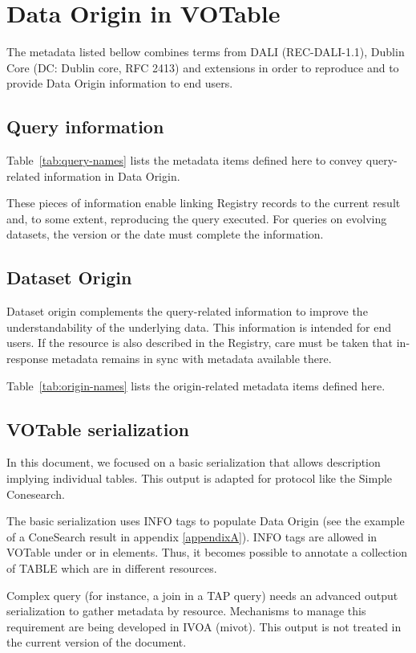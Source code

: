 \documentclass[11pt,a4paper]{ivoa}
\begin{document}
\section{Data Origin in VOTable}

The metadata listed bellow combines terms from DALI (REC-DALI-1.1), Dublin Core (DC: Dublin core, RFC 2413) and extensions in order to reproduce and to provide Data Origin information to end users.

\subsection{Query information}
Table~\ref{tab:query-names} lists the metadata items defined here to
convey query-related information in Data Origin.

These pieces of information enable linking Registry records to the
current result and, to some extent, reproducing the query executed. For
queries on evolving datasets, the version or the date must complete the
information.

\subsection{Dataset Origin}
Dataset origin complements the query-related information to improve the
understandability of the underlying data. This information is intended
for end users.  If the resource is also described in the Registry, care
must be taken that in-response metadata remains in sync with metadata
available there.

Table~\ref{tab:origin-names} lists the origin-related metadata items
defined here.


\subsection{VOTable serialization}

In this document, we focused on a basic serialization that allows description implying individual tables.
This output is adapted for protocol like the Simple Conesearch.

The basic serialization uses INFO tags to populate Data Origin (see the example of a ConeSearch result in appendix  \ref{appendixA}).
INFO tags are allowed in VOTable under  or in  elements.
Thus, it becomes possible to annotate a collection of TABLE which are in different resources.


Complex query (for instance, a join in a TAP query) needs an advanced output serialization to gather metadata by resource.
Mechanisms to manage this requirement are being developed in IVOA (mivot).
This output is not treated in the current version of the document.
\end{document}

